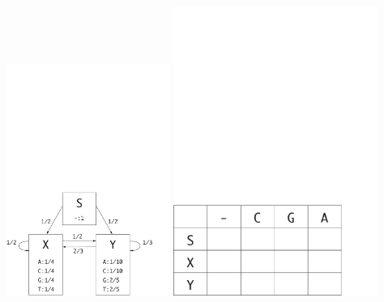 \documentclass[a4paper,11pt]{article}
\begin{document}
\begin{center}
\vskip -5cm
\includegraphics[width=0.4\textwidth]{fig1.pdf}
\includegraphics[width=0.5\textwidth]{fig2.pdf}
\end{center}
\end{document}
